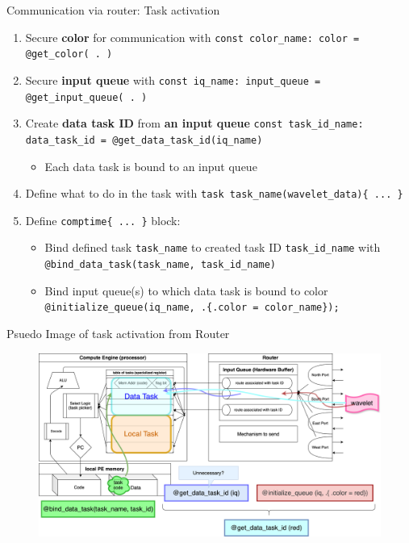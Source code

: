 \documentclass[dvipdfmx, 11pt, aspectratio=169]{beamer}   %
\begin{document}
\begin{frame}[fragile]{Communication via router: Task activation}
\begin{enumerate}
    \item Secure \textbf{color} for communication with \lstinline|const color_name: color = @get_color( . )|
    \item Secure \textbf{input queue} with \lstinline|const iq_name: input_queue = @get_input_queue( . )|
    \item Create \textbf{data task ID} from \textbf{an input queue} \lstinline|const task_id_name: data_task_id = @get_data_task_id(iq_name)|
    \begin{itemize}
        \item Each data task is bound to an input queue
    \end{itemize}
    \item Define what to do in the task with \lstinline|task task_name(wavelet_data){ ... }|
    \item Define \lstinline|comptime{ ... }| block:
    \begin{itemize}
        \item Bind defined task \lstinline|task_name| to created task ID \lstinline|task_id_name| with \lstinline|@bind_data_task(task_name, task_id_name)|
        \item Bind input queue(s) to which data task is bound to color \lstinline|@initialize_queue(iq_name, .{.color = color_name});|
    \end{itemize}
\end{enumerate}
\end{frame}
\begin{frame}{Psuedo Image of task activation from Router}
\begin{figure}
    \includegraphics[scale=0.07]{img/csCommunication.png}
\end{figure}
\end{frame}
\end{document}
